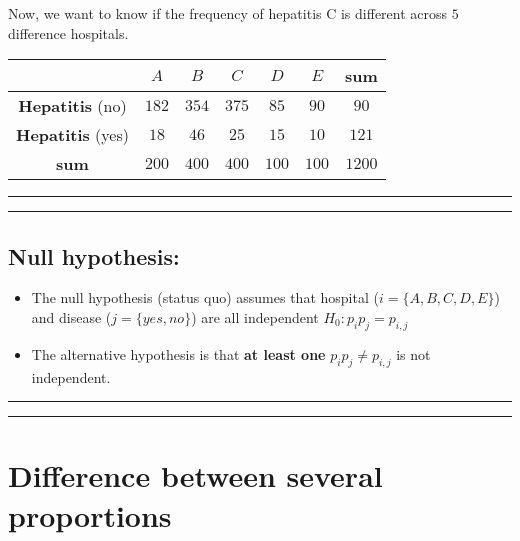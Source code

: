 \documentclass[
]{book}
\begin{document}
Now, we want to know if the frequency of hepatitis C is different across \(5\) difference hospitals.

\begin{longtable}[]{@{}ccccccc@{}}
\toprule
& \(A\) & \(B\) & \(C\) & \(D\) & \(E\) & sum \\
\midrule
\endhead
\textbf{Hepatitis} (no) & \(182\) & \(354\) & \(375\) & \(85\) & \(90\) & \(90\) \\
\textbf{Hepatitis} (yes) & \(18\) & \(46\) & \(25\) & \(15\) & \(10\) & \(121\) \\
\textbf{sum} & \(200\) & \(400\) & \(400\) & \(100\) & \(100\) & \(1200\) \\
\bottomrule
\end{longtable}

\begin{center}\rule{0.5\linewidth}{0.5pt}\end{center}

\begin{center}\rule{0.5\linewidth}{0.5pt}\end{center}

\hypertarget{null-hypothesis-3}{%
\subsection{Null hypothesis:}\label{null-hypothesis-3}}

\begin{itemize}
\item
  The null hypothesis (status quo) assumes that hospital (\(i=\{A,B,C,D,E\}\)) and disease (\(j=\{yes, no\}\)) are all independent \(H_0: p_ip_j=p_{i,j}\)
\item
  The alternative hypothesis is that \textbf{at least one} \(p_ip_j\neq p_{i,j}\) is not independent.
\end{itemize}

\begin{center}\rule{0.5\linewidth}{0.5pt}\end{center}

\begin{center}\rule{0.5\linewidth}{0.5pt}\end{center}

\hypertarget{difference-between-several-proportions-1}{%
\section{Difference between several proportions}\label{difference-between-several-proportions-1}}
\end{document}
